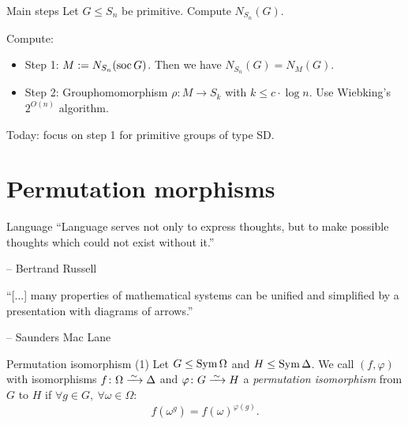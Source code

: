 \documentclass{beamer}
\theoremstyle{plain}
\theoremstyle{definition}
\begin{document}

\begin{frame}{Main steps}
Let $G \leq S_n$ be primitive.
Compute $N_{S_n}(G)$.

Compute:
\begin{itemize}
\item Step 1: $M := N_{S_n}(\operatorname{soc} G)$.
Then we have $N_{S_n}(G) = N_M(G)$.

\item Step 2: Grouphomomorphism
$
    \rho : M \to S_k
$
with $k \leq c \cdot \log n$.
Use Wiebking's $2 ^ {O(n)}$ algorithm.
\end{itemize}
\vspace{1em}

\pause
Today: focus on step 1 for primitive groups of type SD.
\end{frame}

\section{Permutation morphisms}
\begin{frame}{Language}
``Language serves not only to express thoughts, but to make possible thoughts
which could not exist without it.''

\hfill --
Bertrand Russell
\hspace{2em}

\vspace{2em}

``[...] many properties of mathematical systems can be unified and simplified
by a presentation with diagrams of arrows.''

\hfill --
Saunders Mac Lane
\hspace{2em}
\end{frame}

\begin{frame}{Permutation isomorphism (1)}
Let $G \leq \operatorname{Sym} \Omega$ and $H \leq \operatorname{Sym} \Delta$.
We call $(f, \varphi)$ with
isomorphisms
$f \from \Omega \iso \Delta$
and
$\varphi \from G \iso H$
a \emph{permutation isomorphism}
from $G$ to $H$
if
$\forall g \in G, ~ \forall \omega \in \Omega :$
\[
    f(\omega ^ g) = f(\omega) ^ {\varphi(g)}.
\]
\end{frame}
\end{document}
